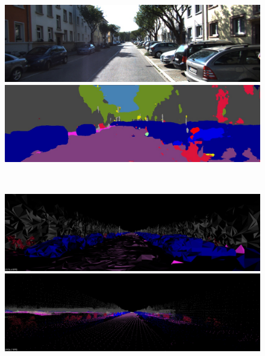 \begin{figure}[htbp]
 \begin{minipage}[b]{0.50\hsize}
 \begin{center}
  \includegraphics[keepaspectratio, scale=0.18]{./picture/bgrimage/bgrimage7.jpg}
  \end{center}
 \end{minipage}
 \begin{minipage}[b]{0.5\hsize}
 \begin{center}
  \includegraphics[keepaspectratio, scale=0.18]{./picture/segimage/image7.jpg}
  \end{center}
 \end{minipage} \\
 \begin{minipage}[b]{0.50\hsize}
 \begin{center}
  \includegraphics[keepaspectratio, scale=0.18]{./picture/mesh_map_image/image7.jpg}
  \end{center}
 \end{minipage}
 \begin{minipage}[b]{0.50\hsize}
 \begin{center}
  \includegraphics[keepaspectratio, scale=0.18]{./picture/point_map_image/image7.jpg}

\end{center}
\end{minipage}
\end{figure}
